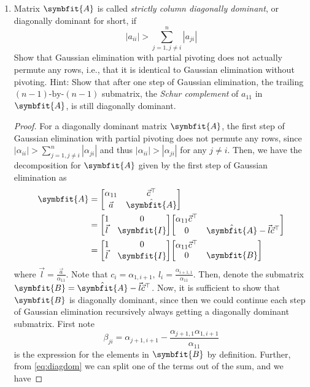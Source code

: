 \documentclass{article}
\theoremstyle{definition}
\newcommand{\mat}[1]{\symbfit{#1}}
\begin{document}
\begin{enumerate}[leftmargin=\labelsep]
	\item Matrix \(\mat{A}\) is called \emph{strictly column diagonally dominant}, or diagonally dominant for short, if
	      \begin{equation}
		      |a_{ii}| > \sum_{j=1, j \neq i}^{n} |a_{ji}| \label{eq:diagdom}
	      \end{equation}
	      Show that Gaussian elimination with partial pivoting does not actually permute any rows, i.e., that it is identical to Gaussian elimination without pivoting. Hint: Show that after one step of Gaussian elimination, the trailing \((n - 1)\text{-by-}(n - 1)\) submatrix, the \emph{Schur complement} of \(a_{11}\) in \(\mat{A}\), is still diagonally dominant.
	      \begin{proof}
		      For a diagonally dominant matrix \(\mat{A}\), the first step of Gaussian elimination with partial pivoting does not permute any rows, since \(|\alpha_{ii}| > \sum_{j=1, j \neq i}^{n} |\alpha_{ji}|\) and thus \(|\alpha_{ii}| > |\alpha_{ji}|\) for any \(j\neq i\). Then, we have the decomposition for \(\mat{A}\) given by the first step of Gaussian elimination as
		      \begin{align*}
			      \mat{A} & = \mqty[\alpha_{11} & \vec{c}^{\top} \\ \vec{a} & \hat{\mat{A}}]\\
			              & = \mqty[1           & 0              \\ \vec{l} & \mat{I}] \mqty[\alpha_{11} \vec{c}^{\top} \\ 0 & \hat{\mat{A}}-\vec{l}\vec{c}^{\top}] \\
			              & = \mqty[1           & 0              \\ \vec{l} & \mat{I}] \mqty[\alpha_{11} \vec{c}^{\top} \\ 0 & \mat{B}]
		      \end{align*}
		      where \(\vec{l} = \frac{\vec{a}}{\alpha_{11}}\). Note that \(c_i = \alpha_{1,i + 1},\ l_i = \frac{\alpha_{i + 1, 1}}{\alpha_{11}}\). Then, denote the submatrix \(\mat{B}=\hat{\mat{A}}-\vec{l}\vec{c}^{\top}\). Now, it is sufficient to show that \(\mat{B}\) is diagonally dominant, since then we could continue each step of Gaussian elimination recursively always getting a diagonally dominant submatrix. First note
		      \begin{equation}
			      \beta_{ji} = \alpha_{j+1,i+1} - \frac{\alpha_{j+1,1}\alpha_{1,i+1}}{\alpha_{11}} \label{eq:bji}
		      \end{equation}
		      is the expression for the elements in \(\mat{B}\) by definition. Further, from \cref{eq:diagdom} we can split one of the terms out of the sum, and we have

\end{proof}
\end{enumerate}
\end{document}
